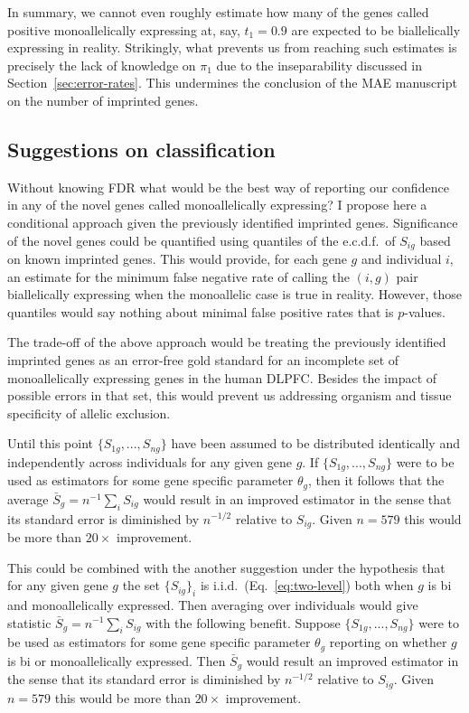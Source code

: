 \documentclass[letterpaper]{article}
\begin{document}
In summary, we cannot even roughly estimate how many of the genes called
positive monoallelically expressing at, say, \(t_1=0.9\) are expected to be
biallelically expressing in reality.  Strikingly, what prevents us from
reaching such estimates is precisely the lack of knowledge on \(\pi_1\) due to
the inseparability discussed in Section~\ref{sec:error-rates}.  This
undermines the conclusion of the MAE manuscript on the number of imprinted
genes.

\subsection{Suggestions on classification}

Without knowing FDR what would be the best way of reporting our confidence in any of
the novel genes called monoallelically expressing?  I propose here a
conditional approach given the previously identified imprinted genes.
Significance of the novel genes could be quantified using quantiles of the
e.c.d.f.~of \(S_{ig}\) based on known imprinted genes.  This would provide,
for each gene \(g\) and individual \(i\),
an estimate for the minimum false negative rate of calling the \((i,g)\) pair
biallelically expressing when the monoallelic case is true in reality.
However, those quantiles would say nothing about minimal false positive
rates that is \(p\)-values.

The trade-off of the above approach would be treating the previously
identified imprinted genes as an error-free gold standard for an incomplete
set of monoallelically expressing genes in the human DLPFC.  Besides the
impact of possible errors in that set, this would
prevent us addressing organism and tissue specificity of allelic exclusion.

Until this point \(\{S_{1g},...,S_{ng}\}\) have been assumed to be distributed
identically and independently across individuals for any given gene \(g\).  If
\(\{S_{1g},...,S_{ng}\}\) were to be used as estimators for some gene specific
parameter \(\theta_g\), then it follows that the average
\(\bar{S}_g=n^{-1}\sum_i S_{ig}\) would result in an improved estimator in the
sense that its standard error is diminished by \(n^{-1/2}\) relative to
\(S_{ig}\).  Given $n=579$ this would be more than \(20\times\) improvement.

This could be combined with the another suggestion under the hypothesis
that for any given gene \(g\) the set \(\{S_{ig}\}_{i}\) is
i.i.d.~(Eq.~\ref{eq:two-level}) both when \(g\) is bi and monoallelically
expressed.  Then averaging over individuals would give statistic
\(\bar{S}_g=n^{-1}\sum_i S_{ig}\) with the following benefit.  Suppose
\(\{S_{1g},...,S_{ng}\}\) were to be used as estimators for some gene specific
parameter \(\theta_g\) reporting on whether \(g\) is bi or monoallelically
expressed.  Then \(\bar{S}_g\) would result an improved estimator
in the sense that its standard error is diminished by \(n^{-1/2}\) relative to
\(S_{ig}\).  Given $n=579$ this would be more than \(20\times\) improvement.
\end{document}
